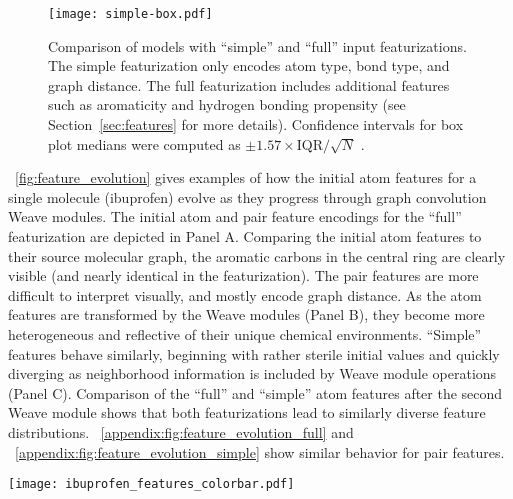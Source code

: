 \begin{figure}[tb]
\centering
  \texttt{[image: simple-box.pdf]}
  \caption{
    Comparison of models with ``simple'' and ``full'' input featurizations. The
    simple featurization only encodes atom type, bond type, and graph distance.
    The full featurization includes additional features such as aromaticity and
    hydrogen bonding propensity (see Section~\ref{sec:features} for more
    details). Confidence intervals for box plot medians were computed as
    ${\pm 1.57 \times \text{IQR} / \sqrt{N}}$ \citep{mcgill1978variations}.
  }
  \label{fig:simple_features}
\end{figure}

\figurename~\ref{fig:feature_evolution} gives examples of how the initial atom
features for a single molecule (ibuprofen) evolve as they progress through graph
convolution Weave modules. The initial atom and pair feature encodings for the
``full'' featurization are depicted in Panel A. Comparing the initial atom
features to their source molecular graph, the aromatic carbons in the central
ring are clearly visible (and nearly identical in the featurization). The pair
features are more difficult to interpret visually, and mostly encode graph
distance. As the atom features are transformed by the Weave modules (Panel B),
they become more heterogeneous and reflective of their unique chemical
environments. ``Simple'' features behave similarly, beginning with rather
sterile initial values and quickly diverging as neighborhood information is
included by Weave module operations (Panel C). Comparison of the ``full'' and
``simple'' atom features after the second Weave module shows that both
featurizations lead to similarly diverse feature distributions.
\figurename~\ref{appendix:fig:feature_evolution_full} and
\figurename~\ref{appendix:fig:feature_evolution_simple} show similar behavior
for pair features.

\begin{figure*}[tb]
\centering
  \texttt{[image: ibuprofen\_features\_colorbar.pdf]}
  \caption{
    Graph convolution feature evolution. Atoms or pairs are
    displayed on the $y$-axis and the dimensions of the feature vectors are on
    the $x$-axis. (A) Conversion of the molecular graph
    for ibuprofen into atom and (unique) atom pair features. (B) Evolution of
    atom features after successive Weave modules in a graph convolution model
    with a W$_3$N$_2$ architecture and depth 50 convolutions in Weave modules.
    (C) Evolution of ``simple'' atom features (see
    Section~\ref{sec:simple_features}) starting from initial encoding and
    progressing through the Weave modules of a W$_2$N$_2$ architecture. The
    color bar applies to all panels.
  }
  \label{fig:feature_evolution}
\end{figure*}

